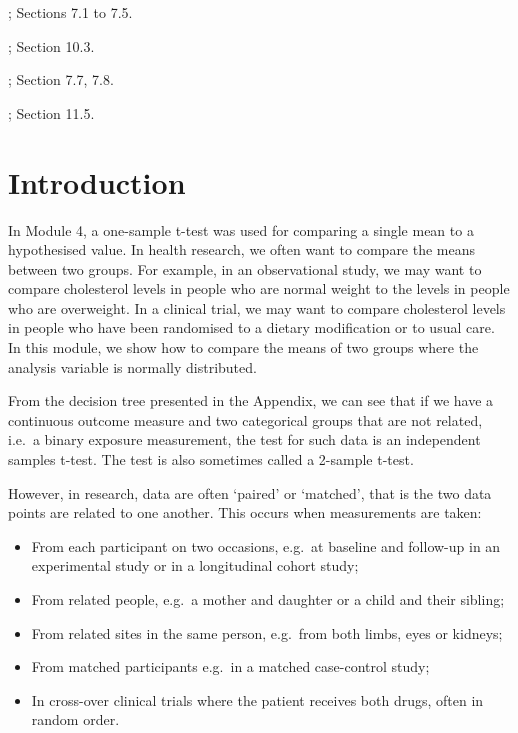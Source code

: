 \documentclass[
]{memoir}
\providecommand{\tightlist}{%
  \setlength{\itemsep}{0pt}\setlength{\parskip}{0pt}}
\begin{document}
\citet{kirkwood_sterne01}; Sections 7.1 to 7.5.

\citet{bland15}; Section 10.3.

\citet{acock10}; Section 7.7, 7.8.

\citet{juul_frydenberg14}; Section 11.5.

\hypertarget{introduction-4}{%
\section{Introduction}\label{introduction-4}}

In Module 4, a one-sample t-test was used for comparing a single mean to a hypothesised value. In health research, we often want to compare the means between two groups. For example, in an observational study, we may want to compare cholesterol levels in people who are normal weight to the levels in people who are overweight. In a clinical trial, we may want to compare cholesterol levels in people who have been randomised to a dietary modification or to usual care. In this module, we show how to compare the means of two groups where the analysis variable is normally distributed.

From the decision tree presented in the Appendix, we can see that if we have a continuous outcome measure and two categorical groups that are not related, i.e.~a binary exposure measurement, the test for such data is an independent samples t-test. The test is also sometimes called a 2-sample t-test.

However, in research, data are often `paired' or `matched', that is the two data points are related to one another. This occurs when measurements are taken:

\begin{itemize}
\tightlist
\item
  From each participant on two occasions, e.g.~at baseline and follow-up in an experimental study or in a longitudinal cohort study;
\item
  From related people, e.g.~a mother and daughter or a child and their sibling;
\item
  From related sites in the same person, e.g.~from both limbs, eyes or kidneys;
\item
  From matched participants e.g.~in a matched case-control study;
\item
  In cross-over clinical trials where the patient receives both drugs, often in random order.
\end{itemize}
\end{document}
